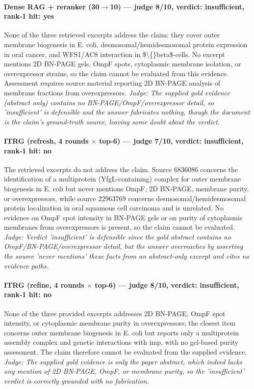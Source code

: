 \documentclass[sigconf, review, anonymous]{acmart}
\begin{document}
\paragraph{Dense RAG + reranker (30$\to$10) --- judge 8/10, verdict: insufficient, rank-1 hit: yes}
\noindent None of the three retrieved excerpts address the claim: they cover outer membrane biogenesis in E. coli, desmosomal/hemidesmosomal protein expression in oral cancer, and WFS1/AC8 interaction in \$\textbackslash\{\}beta\$-cells. No excerpt mentions 2D BN-PAGE gels, OmpF spots, cytoplasmic membrane isolation, or overexpressor strains, so the claim cannot be evaluated from this evidence. Assessment requires source material reporting 2D BN-PAGE analysis of membrane fractions from overexpressors.
\noindent\small\textit{Judge: The supplied gold evidence (abstract only) contains no BN-PAGE/OmpF/overexpressor detail, so 'insufficient' is defensible and the answer fabricates nothing, though the document is the claim's ground-truth source, leaving some doubt about the verdict.}
\paragraph{ITRG (refresh, 4 rounds $\times$ top-6) --- judge 7/10, verdict: insufficient, rank-1 hit: no}
\noindent The retrieved excerpts do not address the claim. Source 6836086 concerns the identification of a multiprotein (YfgL-containing) complex for outer membrane biogenesis in E. coli but never mentions OmpF, 2D BN-PAGE, membrane purity, or overexpressors, while source 22963769 concerns desmosomal/hemidesmosomal protein localization in oral squamous cell carcinoma and is unrelated. No evidence on OmpF spot intensity in BN-PAGE gels or on purity of cytoplasmic membranes from overexpressors is present, so the claim cannot be evaluated.
\noindent\small\textit{Judge: Verdict 'insufficient' is defensible since the gold abstract contains no OmpF/BN-PAGE/overexpressor detail, but the answer overreaches by asserting the source 'never mentions' these facts from an abstract-only excerpt and cites no evidence paths.}
\paragraph{ITRG (refine, 4 rounds $\times$ top-6) --- judge 8/10, verdict: insufficient, rank-1 hit: no}
\noindent None of the three provided excerpts addresses 2D BN-PAGE, OmpF spot intensity, or cytoplasmic membrane purity in overexpressors; the closest item concerns outer membrane biogenesis in E. coli but reports only a multiprotein assembly complex and genetic interactions with imp, with no gel-based purity assessment. The claim therefore cannot be evaluated from the supplied evidence.
\noindent\small\textit{Judge: The supplied gold evidence is only the paper abstract, which indeed lacks any mention of 2D BN-PAGE, OmpF, or membrane purity, so the 'insufficient' verdict is correctly grounded with no fabrication.}
\end{document}
